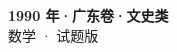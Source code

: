 \documentclass[zihao=-4, a4paper]{ctexart}
\begin{document}
\begin{center}
  {\Large\bfseries 1990 年·广东卷·文史类}\\[4pt]
  {\large 数学 · 试题版}
\end{center}
\medskip
{}

\end{document}
